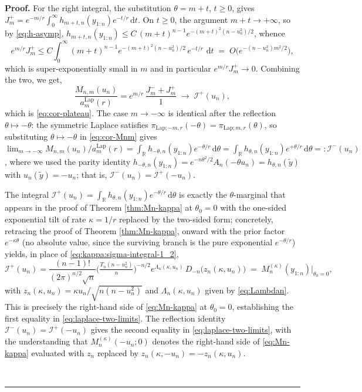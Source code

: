 \documentclass{article}%
\newenvironment{proof}[1][Proof]{\noindent\textbf{#1.} }{\ \rule{0.5em}{0.5em}}
\newcommand{\R}{\mathbb{R}}
\newcommand{\dd}{\,\mathrm{d}}
\begin{document}
\begin{proof}
For the right integral, the substitution \(\theta=m+t\), \(t\ge 0\),
gives \(J^+_m=e^{-m/r}\!\int_0^\infty h_{m+t,n}(y_{1:n})e^{-t/r}\dd t\).
On \(t\ge 0\), the argument \(m+t\to+\infty\), so by \eqref{eq:h-asymp},
\(h_{m+t,n}(y_{1:n})\le C\,(m+t)^{n-1}e^{-(m+t)^2(n-u_n^2)/2}\), whence
\[
   e^{m/r}J^+_m
   \le C\!\int_0^\infty (m+t)^{n-1}
        e^{-(m+t)^2(n-u_n^2)/2}\,e^{-t/r}\,\dd t
   \;=\;O\!\big(e^{-(n-u_n^2)m^2/2}\big),
\]
which is super-exponentially small in \(m\) and in particular \(e^{m/r}J^+_m\to 0\). Combining the two, we get,
\[
   \frac{M_{n,m}(u_n)}{a_m^{\mathrm{Lap}}(r)}
   =e^{m/r}\,\frac{J^-_m+J^+_m}{1}
   \;\longrightarrow\;\mathcal I^{+}(u_n),
\]
which is \eqref{eq:cor-plateau}. The case \(m\to-\infty\) is identical
after the reflection \(\theta\mapsto-\theta\): the symmetric Laplace
satisfies \(\pi_{\mathrm{Lap};-m,r}(-\theta)=\pi_{\mathrm{Lap};m,r}
(\theta)\), so substituting \(\theta\mapsto-\theta\) in
\eqref{eq:cor-Mnm} gives
\(\lim_{m\to-\infty}M_{n,m}(u_n)/a_m^{\mathrm{Lap}}(r)
=\int_\R h_{-\theta,n}(y_{1:n})e^{-\theta/r}\dd\theta
=\int_\R h_{\theta,n}(y_{1:n})e^{+\theta/r}\dd\theta
=:\mathcal I^{-}(u_n)\),
where we used the parity identity
\(h_{-\theta,n}(y_{1:n})=e^{-n\theta^2/2}A_n(-\theta u_n)
=h_{\theta,n}(\widetilde y)\) with \(u_n(\widetilde y)=-u_n\); that is,
\(\mathcal I^{-}(u_n)=\mathcal I^{+}(-u_n)\).

The integral \(\mathcal I^{+}(u_n)=\int_\R h_{\theta,n}(y_{1:n})
e^{-\theta/r}\dd\theta\) is exactly the \(\theta\)-marginal that appears in the proof of Theorem \ref{thm:Mn-kappa} at \(\theta_0=0\) with the one-sided exponential tilt of rate \(\kappa=1/r\) replaced by the two-sided form; concretely, retracing the proof of Theorem \ref{thm:Mn-kappa}, onward with the prior factor \(e^{-\kappa\theta}\) (no absolute value, since the surviving branch is the pure exponential \(e^{-\theta/r}\)) yields, in place of \eqref{eq:kappa:sigma-integral-1_2},
\[
   \mathcal I^{+}(u_n)
   =\frac{(n-1)!}{(2\pi)^{n/2}\sqrt n}
     \Big(\tfrac{T_n(n-u_n^2)}{n}\Big)^{-n/2}
     e^{\Lambda_n(\kappa,u_n)}\,
     D_{-n}\big(z_n(\kappa,u_n)\big)
   \;=\;M^{(\kappa)}_n(y_{1:n})\big|_{\theta_0=0},
\]
with \(z_n(\kappa,u_n)=\kappa u_n/\sqrt{n(n-u_n^2)}\) and
\(\Lambda_n(\kappa,u_n)\) given by \eqref{eq:Lambdan}. This is precisely the
right-hand side of \eqref{eq:Mn-kappa} at \(\theta_0=0\), establishing the first
equality in \eqref{eq:laplace-two-limits}. The reflection identity
\(\mathcal I^{-}(u_n)=\mathcal I^{+}(-u_n)\) gives the second equality in \eqref{eq:laplace-two-limits}, with the understanding that
\(M^{(\kappa)}_n(-u_n;0)\) denotes the right-hand side of \eqref{eq:Mn-kappa} evaluated with \(z_n\) replaced by \(z_n(\kappa,-u_n)=-z_n(\kappa,u_n)\).



\end{proof}
\end{document}
